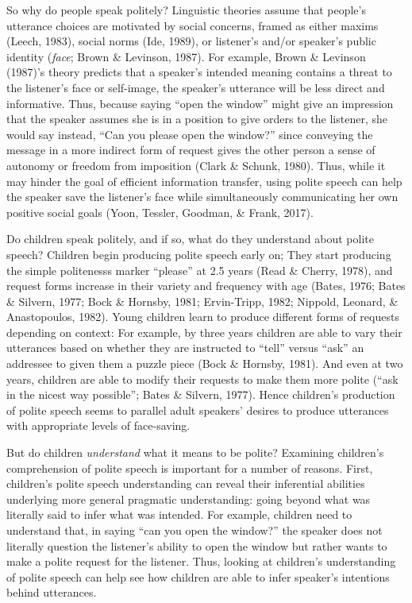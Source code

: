 \documentclass[10pt, letterpaper]{article}
\begin{document}
So why do people speak politely? Linguistic theories assume that
people's utterance choices are motivated by social concerns, framed as
either maxims (Leech, 1983), social norms (Ide, 1989), or listener's
and/or speaker's public identity (\emph{face}; Brown \& Levinson, 1987).
For example, Brown \& Levinson (1987)'s theory predicts that a speaker's
intended meaning contains a threat to the listener's face or self-image,
the speaker's utterance will be less direct and informative. Thus,
because saying ``open the window'' might give an impression that the
speaker assumes she is in a position to give orders to the listener, she
would say instead, ``Can you please open the window?'' since conveying
the message in a more indirect form of request gives the other person a
sense of autonomy or freedom from imposition (Clark \& Schunk, 1980).
Thus, while it may hinder the goal of efficient information transfer,
using polite speech can help the speaker save the listener's face while
simultaneously communicating her own positive social goals (Yoon,
Tessler, Goodman, \& Frank, 2017).

Do children speak politely, and if so, what do they understand about
polite speech? Children begin producing polite speech early on; They
start producing the simple politenesss marker ``please'' at 2.5 years
(Read \& Cherry, 1978), and request forms increase in their variety and
frequency with age (Bates, 1976; Bates \& Silvern, 1977; Bock \&
Hornsby, 1981; Ervin-Tripp, 1982; Nippold, Leonard, \& Anastopoulos,
1982). Young children learn to produce different forms of requests
depending on context: For example, by three years children are able to
vary their utterances based on whether they are instructed to ``tell''
versus ``ask'' an addressee to given them a puzzle piece (Bock \&
Hornsby, 1981). And even at two years, children are able to modify their
requests to make them more polite (``ask in the nicest way possible'';
Bates \& Silvern, 1977). Hence children's production of polite speech
seems to parallel adult speakers' desires to produce utterances with
appropriate levels of face-saving.

But do children \emph{understand} what it means to be polite? Examining
children's comprehension of polite speech is important for a number of
reasons. First, children's polite speech understanding can reveal their
inferential abilities underlying more general pragmatic understanding:
going beyond what was literally said to infer what was intended. For
example, children need to understand that, in saying ``can you open the
window?'' the speaker does not literally question the listener's ability
to open the window but rather wants to make a polite request for the
listener. Thus, looking at children's understanding of polite speech can
help see how children are able to infer speaker's intentions behind
utterances.
\end{document}
